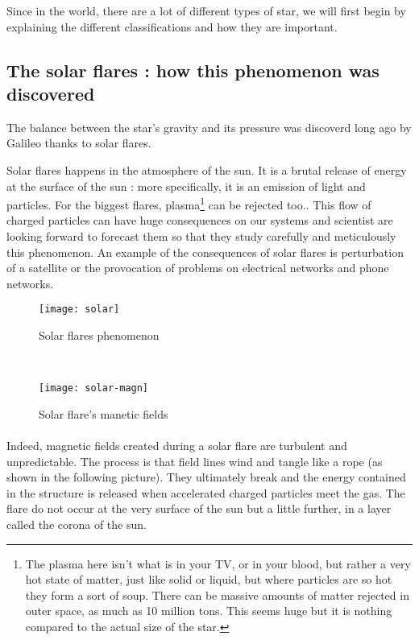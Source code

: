 \documentclass[a4paper, 11pt]{article} %
\begin{document}
Since in the world, there are a lot of different types of star, we will first begin by explaining the different classifications and how they are important.

\subsection{The solar flares : how this phenomenon was discovered}

The balance between the star's gravity and its pressure was discoverd long ago by Galileo thanks to solar flares.

Solar flares happens in the atmosphere of the sun. It is a brutal release of energy at the surface of the sun : more specifically, it is an emission of light and particles. For the biggest flares, plasma\footnote{The plasma here isn't what is in your TV, or in your blood, but rather a very hot state of matter, just like solid or liquid, but where particles are so hot they form a sort of soup. There can be massive amounts of matter rejected in outer space, as much as 10 million tons. This seems huge but it is nothing compared to the actual size of the star.} can be rejected too.. This flow of charged particles can have huge consequences on our systems and scientist are looking forward to forecast them so that they study carefully and meticulously this phenomenon. An example of the consequences of solar flares is perturbation of a satellite or the provocation of problems on electrical networks and phone networks.

\begin{figure*}[h!]
    \centering
  \begin{subfigure}[b]{0.45\textwidth}
      \texttt{[image: solar]}
      \caption{Solar flares phenomenon}
  \end{subfigure}%
  ~ 
  \begin{subfigure}[b]{0.45\textwidth}
      \centering
      \texttt{[image: solar-magn]}
      \caption{Solar flare's manetic fields}
  \end{subfigure}
\end{figure*}



\paragraph*{}
Indeed, magnetic fields created during a solar flare are turbulent and unpredictable. The process is that field lines wind and tangle like a rope (as shown in the following picture). They ultimately break and the energy contained in the structure is released when accelerated charged particles meet the gas. The flare do not occur at the very surface of the sun but a little further, in a layer called the corona of the sun. 
\end{document}
